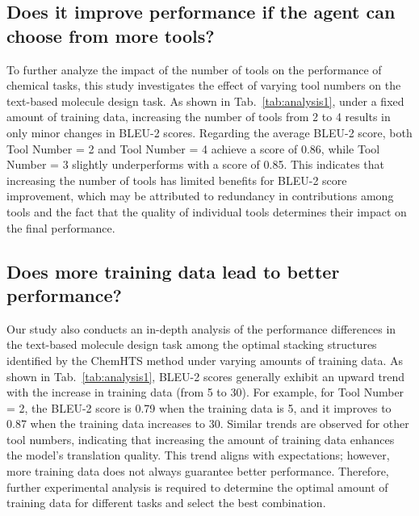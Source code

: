 \subsection{Does it improve performance if the agent can choose from more tools?}
To further analyze the impact of the number of tools on the performance of chemical tasks, this study investigates the effect of varying tool numbers on the text-based molecule design task. 
As shown in Tab.~\ref{tab:analysis1}, under a fixed amount of training data, increasing the number of tools from 2 to 4 results in only minor changes in BLEU-2 scores. Regarding the average BLEU-2 score, both Tool Number = 2 and Tool Number = 4 achieve a score of 0.86, while Tool Number = 3 slightly underperforms with a score of 0.85. This indicates that increasing the number of tools has limited benefits for BLEU-2 score improvement, which may be attributed to redundancy in contributions among tools and the fact that the quality of individual tools determines their impact on the final performance.

\subsection{Does more training data lead to better performance?}
Our study also conducts an in-depth analysis of the performance differences in the text-based molecule design task among the optimal stacking structures identified by the ChemHTS method under varying amounts of training data.
As shown in Tab.~\ref{tab:analysis1}, BLEU-2 scores generally exhibit an upward trend with the increase in training data (from 5 to 30). For example, for Tool Number = 2, the BLEU-2 score is 0.79 when the training data is 5, and it improves to 0.87 when the training data increases to 30. Similar trends are observed for other tool numbers, indicating that increasing the amount of training data enhances the model's translation quality. This trend aligns with expectations; however, more training data does not always guarantee better performance. Therefore, further experimental analysis is required to determine the optimal amount of training data for different tasks and select the best combination.

